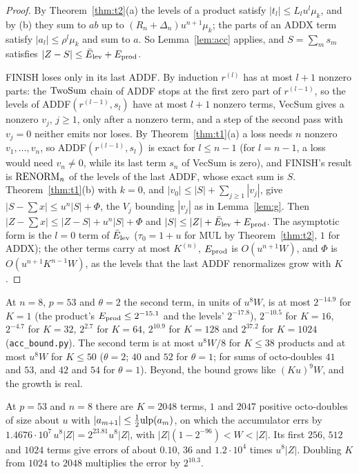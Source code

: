 \begin{proof}
By Theorem~\ref{thm:t2}(a) the levels of a product satisfy $|t_l| \le L_lu^l\mu_k$, and by (b) they sum to $a b$
up to $(R_n+\Delta_n)u^{n+1}\mu_k$; the parts of an ADDX term satisfy $|a_l| \le \rho^l\mu_k$ and sum to $a$. So
Lemma~\ref{lem:acc} applies, and $S = \sum_m s_m$ satisfies $|Z - S| \le \bar E_{\rm lev} + E_{\rm prod}$.

FINISH loses only in its last ADDF. By induction $r^{(l)}$ has at most $l+1$ nonzero parts: the $\mathrm{TwoSum}$ chain of
ADDF stops at the first zero part of $r^{(l-1)}$, so the levels of ADDF$(r^{(l-1)}, s_l)$ have at most $l+1$ nonzero
terms, VecSum gives a nonzero $v_j$, $j \ge 1$, only after a nonzero term, and a step of the second pass with $v_j = 0$
neither emits nor loses. By Theorem~\ref{thm:t1}(a) a loss needs $n$ nonzero $v_1, \dots, v_n$, so ADDF$(r^{(l-1)},
s_l)$ is exact for $l \le n-1$ (for $l = n-1$, a loss would need $v_n \ne 0$, while its last term $s_n$ of VecSum is
zero), and FINISH's result is $\mathrm{RENORM}_n$ of the levels of the last ADDF, whose exact sum is $S$. Theorem~\ref{thm:t1}(b) with
$k = 0$, and $|v_0| \le |S| + \sum_{j \ge 1}|v_j|$, give $|S - \sum x| \le u^n|S| + \Phi$, the $V_j$ bounding
$|v_j|$ as in Lemma~\ref{lem:g}. Then $|Z - \sum x| \le |Z - S| + u^n|S| + \Phi$ and $|S| \le |Z| + \bar E_{\rm lev} +
E_{\rm prod}$. The asymptotic form is the $l = 0$ term of $\bar E_{\rm lev}$ ($\tau_0 = 1 + u$ for MUL by
Theorem~\ref{thm:t2}, $1$ for ADDX); the other terms carry at most $K^{(n)}$, $E_{\rm prod}$ is $O(u^{n+1}W)$, and $\Phi$ is $O(u^{n+1}K^{n-1}W)$, as
the levels that the last ADDF renormalizes grow with $K$.
\end{proof}

At $n = 8$, $p = 53$ and $\theta = 2$ the second term, in units of $u^8W$, is at most $2^{-14.9}$ for $K = 1$ (the
product's $E_{\rm prod} \le 2^{-15.1}$ and the levels' $2^{-17.8}$), $2^{-10.5}$ for $K = 16$, $2^{-4.7}$ for $K = 32$,
$2^{2.7}$ for $K = 64$, $2^{10.9}$ for $K = 128$ and $2^{37.2}$ for $K = 1024$ (\texttt{acc\_bound.py}). The second term is at most $u^8W/8$ for $K \le 38$ products and at most $u^8W$
for $K \le 50$ ($\theta = 2$; $40$ and $52$ for $\theta = 1$; for sums of octo-doubles $41$ and $53$, and $42$ and $54$ for $\theta =
1$). Beyond, the bound
grows like $(Ku)^{9}W$, and the growth is real.

\begin{proposition}\label{prop:acc-low}
At $p = 53$ and $n = 8$ there are $K = 2048$ terms, $1$ and $2047$ positive octo-doubles of size about $u$ with
$|a_{m+1}| \le \frac12\mathrm{ulp}(a_m)$, on which the accumulator errs by $1.4676 \cdot 10^7\,u^8|Z| = 2^{23.81}u^8|Z|$, with
$|Z|(1 - 2^{-96}) < W < |Z|$. Its first $256$, $512$ and $1024$ terms give errors of about $0.10$, $36$ and $1.2 \cdot 10^4$
times $u^8|Z|$. Doubling $K$ from $1024$ to $2048$ multiplies the error by $2^{10.3}$.
\end{proposition}

